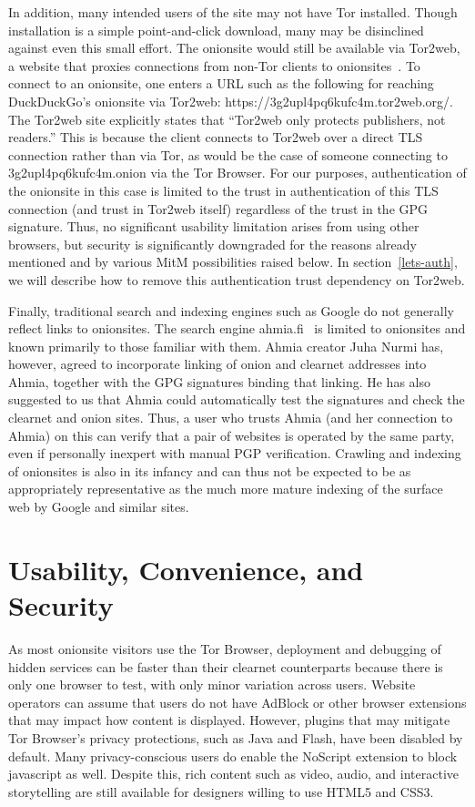 \documentclass[10pt, conference, compsocconf]{styles/IEEEtran}
\begin{document}
In addition, many intended users of the site may not have Tor installed.
Though installation is a simple point-and-click download, many may be
disinclined against even this small effort. The onionsite would still
be available via Tor2web, a website that proxies connections from
non-Tor clients to onionsites~\cite{tor2web}.  To connect to an onionsite,
one enters a URL such as the following for reaching
DuckDuckGo's onionsite via Tor2web:
https://3g2upl4pq6kufc4m.tor2web.org/. The Tor2web site explicitly
states that ``Tor2web only protects publishers, not readers.'' This is
because the client connects to Tor2web over a direct TLS connection
rather than via Tor, as would be the case of someone connecting to
3g2upl4pq6kufc4m.onion via the Tor Browser.  For our purposes,
authentication of the onionsite in this case is limited to the trust
in authentication of this TLS connection (and trust in Tor2web itself)
regardless of the trust in the GPG signature. Thus, no significant
usability limitation arises from using other browsers, but security
is significantly downgraded for the reasons already mentioned and by various
MitM possibilities raised below. In section~\ref{lets-auth}, we
will describe how to remove this authentication trust dependency on Tor2web.

Finally, traditional search and indexing engines such as Google do not
generally reflect links to onionsites. The
search engine ahmia.fi~\cite{ahmia} is limited to
onionsites and known primarily to those
familiar with them. Ahmia creator Juha Nurmi has, however, agreed to
incorporate linking of onion and clearnet addresses into
Ahmia, together with the GPG signatures binding that linking.
He has also suggested to us that Ahmia could
automatically test the signatures and check the clearnet and onion
sites. Thus, a user who trusts Ahmia (and her connection to Ahmia)
on this can verify that a pair of
websites is operated by the same party, even if personally inexpert
with manual PGP verification. Crawling and indexing of
onionsites is also in its infancy and can thus not be expected to be
as appropriately representative as the much more mature indexing of
the surface web by Google and similar sites.

\section{Usability, Convenience, and Security}

As most onionsite visitors use the Tor Browser, deployment and
debugging of hidden services can be faster than their clearnet
counterparts because there is only one browser to test, with only
minor variation across users.  Website operators can assume that users
do not have AdBlock or other browser extensions that may impact how
content is displayed.  However, plugins that may mitigate Tor
Browser's privacy protections, such as Java and Flash, have been
disabled by default.  Many privacy-conscious users do enable the
NoScript extension to block javascript as well.  Despite this, rich
content such as video, audio, and interactive storytelling are still
available for designers willing to use HTML5 and CSS3.
\end{document}
